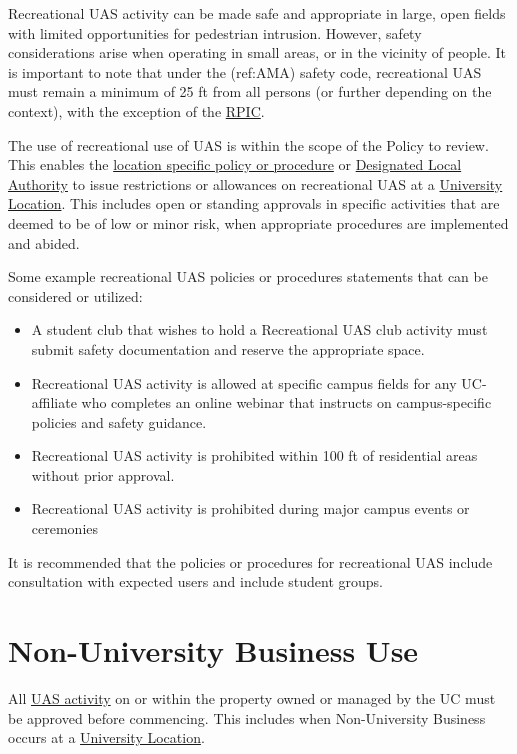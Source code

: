 \documentclass[
]{book}
\providecommand{\tightlist}{%
  \setlength{\itemsep}{0pt}\setlength{\parskip}{0pt}}
\begin{document}
Recreational UAS activity can be made safe and appropriate in large, open fields with limited opportunities for pedestrian intrusion. However, safety considerations arise when operating in small areas, or in the vicinity of people. It is important to note that under the (ref:AMA) safety code, recreational UAS must remain a minimum of 25 ft from all persons (or further depending on the context), with the exception of the \protect\hyperlink{RPIC}{RPIC}.

The use of recreational use of UAS is within the scope of the Policy to review. This enables the \protect\hyperlink{LSP}{location specific policy or procedure} or \protect\hyperlink{DLA}{Designated Local Authority} to issue restrictions or allowances on recreational UAS at a \protect\hyperlink{UL}{University Location}. This includes open or standing approvals in specific activities that are deemed to be of low or minor risk, when appropriate procedures are implemented and abided.

Some example recreational UAS policies or procedures statements that can be considered or utilized:

\begin{itemize}
\tightlist
\item
  A student club that wishes to hold a Recreational UAS club activity must submit safety documentation and reserve the appropriate space.
\item
  Recreational UAS activity is allowed at specific campus fields for any UC-affiliate who completes an online webinar that instructs on campus-specific policies and safety guidance.
\item
  Recreational UAS activity is prohibited within 100 ft of residential areas without prior approval.
\item
  Recreational UAS activity is prohibited during major campus events or ceremonies
\end{itemize}

It is recommended that the policies or procedures for recreational UAS include consultation with expected users and include student groups.

\hypertarget{non-university-business-use}{%
\section{Non-University Business Use}\label{non-university-business-use}}

All \protect\hyperlink{UASactivity}{UAS activity} on or within the property owned or managed by the UC must be approved before commencing. This includes when Non-University Business occurs at a \protect\hyperlink{UL}{University Location}.
\end{document}
